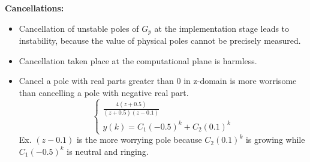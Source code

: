 \textbf{\large Cancellations:}
\begin{itemize}
    \item Cancellation of unstable poles of $G_p$ at the implementation stage leads to instability, because the value of physical poles cannot be precisely measured.
    \item Cancellation taken place at the computational plane is harmless.
    \item Cancel a pole with real parts greater than 0 in z-domain is more worrisome than cancelling a pole with negative real part.
    \begin{equation*}
        \begin{cases}
            \frac{4(z+0.5)}{(z+0.5)(z-0.1)} \\
            y(k) = C_1 (-0.5)^k + C_2 (0.1)^k
        \end{cases}
    \end{equation*}
    Ex. $(z-0.1)$ is the more worrying pole because $C_2 (0.1)^k$ is growing while $C_1 (-0.5)^k$ is neutral and ringing.
\end{itemize}
